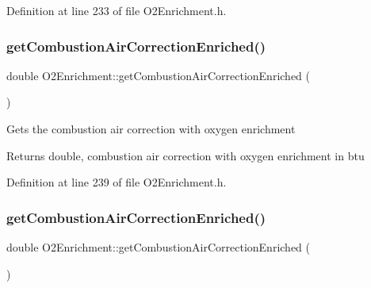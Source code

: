 Definition at line 233 of file O2\+Enrichment.\+h.

\mbox{\label{class_o2_enrichment_aa8bbec67d760c83da77ce5b4ee01e41c}} 
\subsubsection{\texorpdfstring{get\+Combustion\+Air\+Correction\+Enriched()}{getCombustionAirCorrectionEnriched()}\hspace{0.1cm}{\footnotesize\ttfamily [1/3]}}
{\footnotesize\ttfamily double O2\+Enrichment\+::get\+Combustion\+Air\+Correction\+Enriched (\begin{DoxyParamCaption}{ }\end{DoxyParamCaption})\hspace{0.3cm}{\ttfamily [inline]}}

Gets the combustion air correction with oxygen enrichment \begin{DoxyReturn}{Returns}
double, combustion air correction with oxygen enrichment in btu 
\end{DoxyReturn}


Definition at line 239 of file O2\+Enrichment.\+h.

\mbox{\label{class_o2_enrichment_aa8bbec67d760c83da77ce5b4ee01e41c}} 
\subsubsection{\texorpdfstring{get\+Combustion\+Air\+Correction\+Enriched()}{getCombustionAirCorrectionEnriched()}\hspace{0.1cm}{\footnotesize\ttfamily [2/3]}}
{\footnotesize\ttfamily double O2\+Enrichment\+::get\+Combustion\+Air\+Correction\+Enriched (\begin{DoxyParamCaption}{ }\end{DoxyParamCaption})\hspace{0.3cm}{\ttfamily [inline]}}

